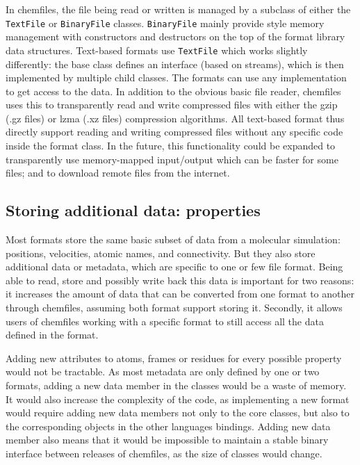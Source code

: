 \documentclass[thesis]{subfiles}
\begin{document}
In chemfiles, the file being read or written is managed by a subclass of either
the \texttt{TextFile} or \texttt{BinaryFile} classes. \texttt{BinaryFile} mainly
provide \cxx style memory management with constructors and destructors on the
top of the format library data structures. Text-based formats use
\texttt{TextFile} which works slightly differently: the base class defines an
interface (based on \cxx streams), which is then implemented by multiple child
classes. The formats can use any implementation to get access to the data. In
addition to the obvious basic file reader, chemfiles uses this to transparently
read and write compressed files with either the gzip (.gz files) or lzma (.xz
files) compression algorithms. All text-based format thus directly support
reading and writing compressed files without any specific code inside the format
class. In the future, this functionality could be expanded to transparently use
memory-mapped input/output which can be faster for some files; and to download
remote files from the internet.

\subsection{Storing additional data: properties}

Most formats store the same basic subset of data from a molecular simulation:
positions, velocities, atomic names, and connectivity. But they also store
additional data or metadata, which are specific to one or few file format. Being
able to read, store and possibly write back this data is important for two
reasons: it increases the amount of data that can be converted from one format
to another through chemfiles, assuming both format support storing it. Secondly,
it allows users of chemfiles working with a specific format to still access all
the data defined in the format.

Adding new attributes to atoms, frames or residues for every possible property
would not be tractable. As most metadata are only defined by one or two
formats, adding a new data member in the classes would be a waste of memory. It
would also increase the complexity of the code, as implementing a new format
would require adding new data members not only to the core \cxx classes, but
also to the corresponding objects in the other languages bindings. Adding new
data member also means that it would be impossible to maintain a stable binary
interface between releases of chemfiles, as the size of classes would change.
\end{document}
